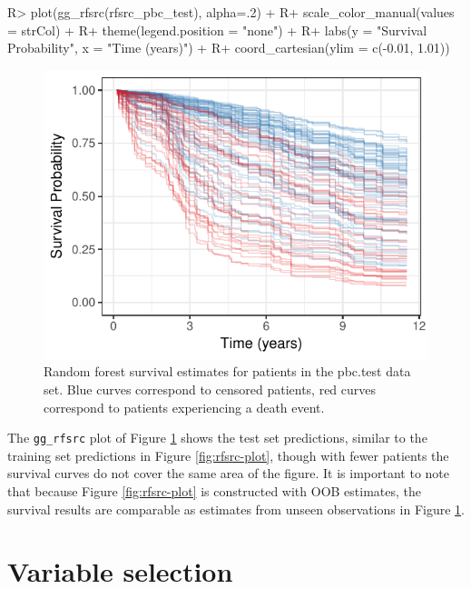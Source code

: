 \documentclass[article, nojss]{jss}
\begin{document}
\begin{Schunk}
\begin{Sinput}
R> plot(gg_rfsrc(rfsrc_pbc_test), alpha=.2) +
R+   scale_color_manual(values = strCol) +
R+   theme(legend.position = "none") +
R+   labs(y = "Survival Probability", x = "Time (years)") +
R+   coord_cartesian(ylim = c(-0.01, 1.01))
\end{Sinput}
\begin{figure}[!htb]

{\centering \includegraphics{rfs-predictPlot-1}

}

\caption[Random forest survival estimates for patients in the pbc.test data set]{Random forest survival estimates for patients in the pbc.test data set. Blue curves correspond to censored patients, red curves correspond to patients experiencing a death event.}\label{fig:predictPlot}
\end{figure}
\end{Schunk}

The \texttt{gg\_rfsrc} plot of Figure \ref{fig:predictPlot} shows the
test set predictions, similar to the training set predictions in Figure
\ref{fig:rfsrc-plot}, though with fewer patients the survival curves do
not cover the same area of the figure. It is important to note that
because Figure \ref{fig:rfsrc-plot} is constructed with OOB estimates,
the survival results are comparable as estimates from unseen
observations in Figure \ref{fig:predictPlot}.

\section{Variable selection}\label{variable-selection}
\end{document}
